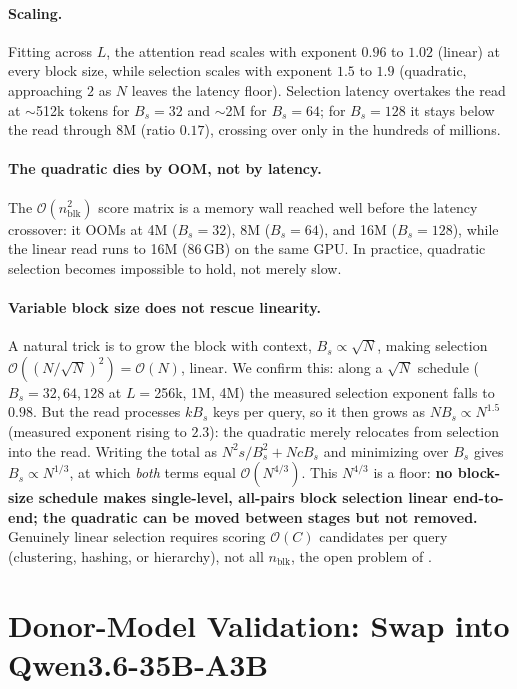 \documentclass[10pt,letterpaper]{article}
\newcommand{\Ocomplex}{\mathcal{O}}
\begin{document}
\paragraph{Scaling.} Fitting across $L$, the attention read scales with
exponent $0.96$ to $1.02$ (linear) at every block size, while selection scales
with exponent $1.5$ to $1.9$ (quadratic, approaching $2$ as $N$ leaves the
latency floor). Selection latency overtakes the read at $\sim$512k tokens for
$B_s{=}32$ and $\sim$2M for $B_s{=}64$; for $B_s{=}128$ it stays below the read
through 8M (ratio $0.17$), crossing over only in the hundreds of millions.

\paragraph{The quadratic dies by OOM, not by latency.} The
$\Ocomplex(n_{\text{blk}}^2)$ score matrix is a memory wall reached well before
the latency crossover: it OOMs at 4M ($B_s{=}32$), 8M ($B_s{=}64$), and 16M
($B_s{=}128$), while the linear read runs to 16M (86\,GB) on the same GPU. In
practice, quadratic selection becomes impossible to hold, not merely slow.

\paragraph{Variable block size does not rescue linearity.} A natural trick is
to grow the block with context, $B_s \propto \sqrt{N}$, making selection
$\Ocomplex((N/\sqrt{N})^2) = \Ocomplex(N)$, linear. We confirm this: along a
$\sqrt{N}$ schedule ($B_s{=}32,64,128$ at $L{=}$256k, 1M, 4M) the measured
selection exponent falls to $0.98$. But the read processes $k B_s$ keys per
query, so it then grows as $N B_s \propto N^{1.5}$ (measured exponent rising to
$2.3$): the quadratic merely relocates from selection into the read. Writing
the total as $N^2 s / B_s^2 + N c B_s$ and minimizing over $B_s$ gives
$B_s \propto N^{1/3}$, at which \emph{both} terms equal $\Ocomplex(N^{4/3})$.
This $N^{4/3}$ is a floor: \textbf{no block-size schedule makes single-level,
all-pairs block selection linear end-to-end; the quadratic can be moved between
stages but not removed.} Genuinely linear selection requires scoring
$\Ocomplex(C)$ candidates per query (clustering, hashing, or hierarchy), not
all $n_{\text{blk}}$, the open problem of .

\section{Donor-Model Validation: Swap into Qwen3.6-35B-A3B}
\label{sec:donor}
\end{document}
